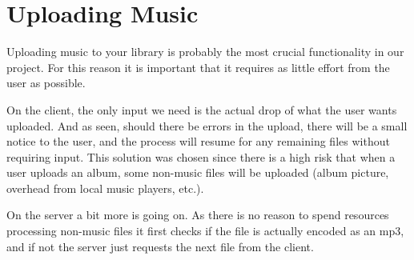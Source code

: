 \clearpage\section{Uploading Music}

\noindent{}

Uploading music to your library is probably the most crucial functionality in our project. For this reason it is important that
it requires as little effort from the user as possible.

On the client, the only input we need is the actual drop of what the user wants uploaded. And as seen, should there be errors in the
upload, there will be a small notice to the user, and the process will resume for any remaining files without requiring input. This
solution was chosen since there is a high risk that when a user uploads an album, some non-music files will be uploaded (album
 picture, overhead from local music players, etc.).

On the server a bit more is going on. As there is no reason to spend resources processing non-music files it first checks if the file is
actually encoded as an mp3, and if not the server just requests the next file from the client.

